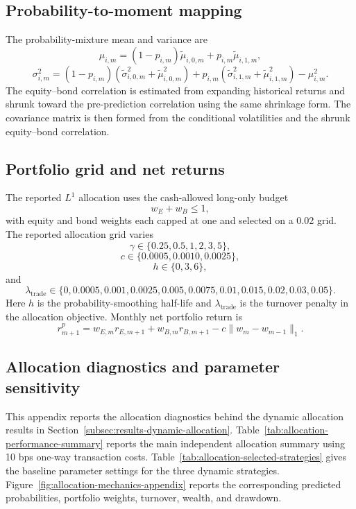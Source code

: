 \subsection{Probability-to-moment mapping}

The probability-mixture mean and variance are
\begin{equation}
\mu_{i,m}
=
(1-p_{i,m})\tilde{\mu}_{i,0,m}
+
p_{i,m}\tilde{\mu}_{i,1,m},
\end{equation}
\begin{equation}
\sigma^2_{i,m}
=
(1-p_{i,m})(\tilde{\sigma}^2_{i,0,m}+\tilde{\mu}_{i,0,m}^{2})
+
p_{i,m}(\tilde{\sigma}^2_{i,1,m}+\tilde{\mu}_{i,1,m}^{2})
-
\mu_{i,m}^{2}.
\end{equation}
The equity--bond correlation is estimated from expanding historical returns and shrunk toward the pre-prediction correlation using the same shrinkage form. The covariance matrix is then formed from the conditional volatilities and the shrunk equity--bond correlation.

\subsection{Portfolio grid and net returns}

The reported \(L^1\) allocation uses the cash-allowed long-only budget
\[
w_E+w_B\le 1,
\]
with equity and bond weights each capped at one and selected on a 0.02 grid. The reported
allocation grid varies
\[
\gamma\in\{0.25,0.5,1,2,3,5\},
\]
\[
c\in\{0.0005,0.0010,0.0025\},
\]
\[
h\in\{0,3,6\},
\]
and
\[
\lambda_{\mathrm{trade}}\in
\{0,0.0005,0.001,0.0025,0.005,0.0075,0.01,0.015,0.02,0.03,0.05\}.
\]
Here \(h\) is the probability-smoothing half-life and \(\lambda_{\mathrm{trade}}\) is the
turnover penalty in the allocation objective.
Monthly net portfolio return is
\begin{equation}
r^{p}_{m+1}
=
w_{E,m}r_{E,m+1}
+
w_{B,m}r_{B,m+1}
-
c\|w_m-w_{m-1}\|_1.
\end{equation}

\subsection{Allocation diagnostics and parameter sensitivity}
\label{app:allocation-diagnostics}

This appendix reports the allocation diagnostics behind the dynamic allocation results in Section~\ref{subsec:results-dynamic-allocation}. Table~\ref{tab:allocation-performance-summary} reports the main independent allocation summary using 10 bps one-way transaction costs. Table~\ref{tab:allocation-selected-strategies} gives the baseline parameter settings for the three dynamic strategies. Figure~\ref{fig:allocation-mechanics-appendix} reports the corresponding predicted probabilities, portfolio weights, turnover, wealth, and drawdown.

